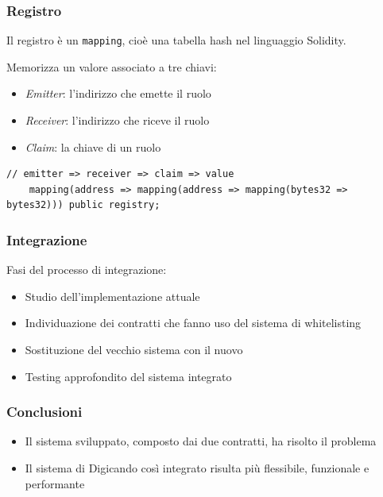 \documentclass{beamer}
\begin{document}
\begin{frame}[fragile]
\frametitle{Registro}

Il registro è un \texttt{mapping}, cioè una tabella hash nel linguaggio Solidity.

Memorizza un valore associato a tre chiavi:

\begin{itemize}
    \item \emph{Emitter}: l'indirizzo che emette il ruolo
    \item \emph{Receiver}: l'indirizzo che riceve il ruolo
    \item \emph{Claim}: la chiave di un ruolo
\end{itemize}

\begin{lstlisting}[language=Solidity]
    // emitter => receiver => claim => value
    mapping(address => mapping(address => mapping(bytes32 => bytes32))) public registry;
\end{lstlisting}

\end{frame}


\begin{frame}[fragile]
\frametitle{Integrazione}

Fasi del processo di integrazione:

\begin{itemize}
    \item Studio dell'implementazione attuale
    \item Individuazione dei contratti che fanno uso del sistema di whitelisting
    \item Sostituzione del vecchio sistema con il nuovo
    \item Testing approfondito del sistema integrato
\end{itemize}

\end{frame}


\begin{frame}
\frametitle{Conclusioni}

\begin{itemize}
    \item Il sistema sviluppato, composto dai due contratti, ha risolto il problema
    \item Il sistema di Digicando così integrato risulta più flessibile, funzionale e performante
\end{itemize}

\end{frame}


\end{document}
